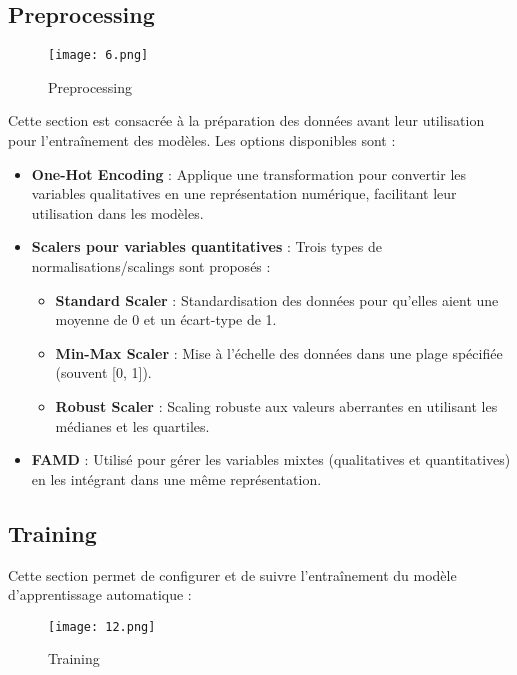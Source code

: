 \documentclass[a4paper,12pt]{article}
\begin{document}
\subsection{Preprocessing}

\begin{figure}[h!]
    \centering
    \texttt{[image: 6.png]}
    \caption{Preprocessing}
    \label{fig:preprocessing}
\end{figure}

Cette section est consacrée à la préparation des données avant leur utilisation pour l'entraînement des modèles. Les options disponibles sont :
\begin{itemize}
    \item \textbf{One-Hot Encoding} : Applique une transformation pour convertir les variables qualitatives en une représentation numérique, facilitant leur utilisation dans les modèles.
    \item \textbf{Scalers pour variables quantitatives} : Trois types de normalisations/scalings sont proposés :
    \begin{itemize}
        \item \textbf{Standard Scaler} : Standardisation des données pour qu'elles aient une moyenne de 0 et un écart-type de 1.
        \item \textbf{Min-Max Scaler} : Mise à l'échelle des données dans une plage spécifiée (souvent [0, 1]).
        \item \textbf{Robust Scaler} : Scaling robuste aux valeurs aberrantes en utilisant les médianes et les quartiles.
    \end{itemize}
    \item \textbf{FAMD} : Utilisé pour gérer les variables mixtes (qualitatives et quantitatives) en les intégrant dans une même représentation.
\end{itemize}

\subsection{Training}
Cette section permet de configurer et de suivre l'entraînement du modèle d'apprentissage automatique :

\begin{figure}[h!]
    \centering
    \texttt{[image: 12.png]}
    \caption{Training}
    \label{fig:enter-label}
\end{figure}
\end{document}
